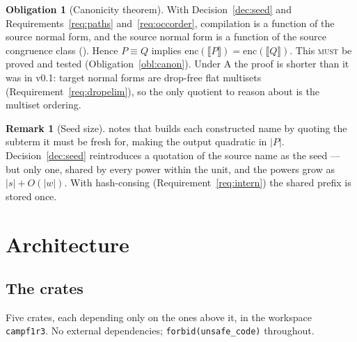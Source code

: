 \documentclass[11pt,a4paper]{article}
\newcommand{\code}[1]{\texttt{#1}}
\newcommand{\MUST}{\textsc{must}}
\newcommand{\enc}[1]{\llbracket #1 \rrbracket}
\newcommand{\scong}{\equiv}
\theoremstyle{definition}
\newtheorem{obligation}[definition]{Obligation}
\newtheorem{remark}[definition]{Remark}
\theoremstyle{plain}
\begin{document}
\begin{obligation}[Canonicity theorem]\label{thm:canon}
With Decision~\ref{dec:seed} and Requirements~\ref{req:paths}
and~\ref{req:occorder}, compilation is a function of the source normal form,
and the source normal form is a function of the source congruence class
(\cite[Prop.~6.9]{k1ndl1ng}). Hence $P \scong Q$ implies
$\mathrm{enc}(\enc{P}) = \mathrm{enc}(\enc{Q})$. This \MUST{} be proved and
tested (Obligation~\ref{obl:canon}). Under A the proof is shorter than it was
in v0.1: target normal forms are drop-free flat multisets
(Requirement~\ref{req:dropelim}), so the only quotient to reason about is the
multiset ordering.
\end{obligation}

\begin{remark}[Seed size]
\cite[Rem.~6.3]{draft3} notes that \cite{rhocomb} builds each constructed name
by quoting the subterm it must be fresh for, making the output quadratic in
$|P|$. Decision~\ref{dec:seed} reintroduces a quotation of the source name as
the seed --- but only one, shared by every power within the unit, and the
powers grow as $|s| + O(|w|)$. With hash-consing
(Requirement~\ref{req:intern}) the shared prefix is stored once.
\end{remark}

\section{Architecture}\label{sec:arch}

\subsection{The crates}

Five crates, each depending only on the ones above it, in the workspace
\code{campf1r3}. No external dependencies; \code{forbid(unsafe\_code)}
throughout.
\end{document}
